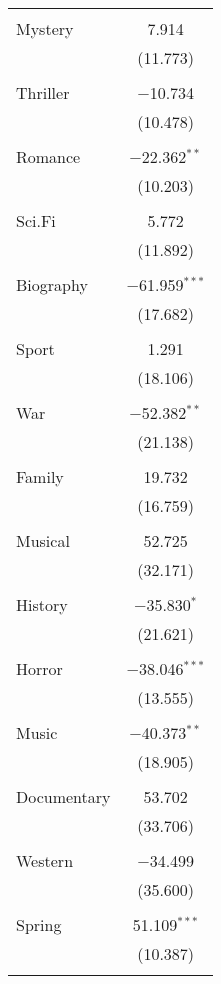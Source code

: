 \begin{table}[!htbp]
\begin{tabular}{@{\extracolsep{5pt}}lc}
  & \\ 
 Mystery & 7.914 \\ 
  & (11.773) \\ 
  & \\ 
 Thriller & $-$10.734 \\ 
  & (10.478) \\ 
  & \\ 
 Romance & $-$22.362$^{**}$ \\ 
  & (10.203) \\ 
  & \\ 
 Sci.Fi & 5.772 \\ 
  & (11.892) \\ 
  & \\ 
 Biography & $-$61.959$^{***}$ \\ 
  & (17.682) \\ 
  & \\ 
 Sport & 1.291 \\ 
  & (18.106) \\ 
  & \\ 
 War & $-$52.382$^{**}$ \\ 
  & (21.138) \\ 
  & \\ 
 Family & 19.732 \\ 
  & (16.759) \\ 
  & \\ 
 Musical & 52.725 \\ 
  & (32.171) \\ 
  & \\ 
 History & $-$35.830$^{*}$ \\ 
  & (21.621) \\ 
  & \\ 
 Horror & $-$38.046$^{***}$ \\ 
  & (13.555) \\ 
  & \\ 
 Music & $-$40.373$^{**}$ \\ 
  & (18.905) \\ 
  & \\ 
 Documentary & 53.702 \\ 
  & (33.706) \\ 
  & \\ 
 Western & $-$34.499 \\ 
  & (35.600) \\ 
  & \\ 
 Spring & 51.109$^{***}$ \\ 
  & (10.387) \\ 
  & \\ 

\end{tabular}
\end{table}
